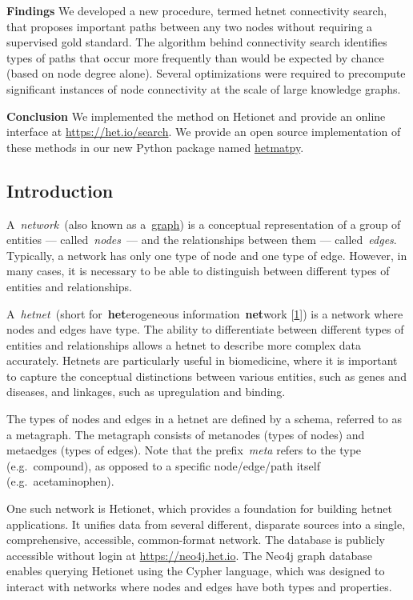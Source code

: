 \textbf{Findings}
We developed a new procedure, termed hetnet connectivity search, that proposes important paths between any two nodes without requiring a supervised gold standard.
The algorithm behind connectivity search identifies types of paths that occur more frequently than would be expected by chance (based on node degree alone).
Several optimizations were required to precompute significant instances of node connectivity at the scale of large knowledge graphs.

\textbf{Conclusion}
We implemented the method on Hetionet and provide an online interface at \url{https://het.io/search}.
We provide an open source implementation of these methods in our new Python package named \href{https://github.com/hetio/hetmatpy}{hetmatpy}.

\hypertarget{introduction}{%
\subsection{Introduction}\label{introduction}}

A~\emph{network}~(also known as a~\href{https://en.wikipedia.org/wiki/Graph_(discrete_mathematics)}{graph}) is a conceptual representation of a group of entities --- called~\emph{nodes}~--- and the relationships between them --- called~\emph{edges}.
Typically, a network has only one type of node and one type of edge.
However, in many cases, it is necessary to be able to distinguish between different types of entities and relationships.

A~\emph{hetnet}~(short for~\textbf{het}erogeneous information~\textbf{net}work {[}\protect\hyperlink{ref-QWTAHxFj}{1}{]}) is a network where nodes and edges have type.
The ability to differentiate between different types of entities and relationships allows a hetnet to describe more complex data accurately.
Hetnets are particularly useful in biomedicine,
where it is important to capture the conceptual distinctions between various entities,
such as genes and diseases, and linkages, such as upregulation and binding.

The types of nodes and edges in a hetnet are defined by a schema, referred to as a metagraph.
The metagraph consists of metanodes (types of nodes) and metaedges (types of edges).
Note that the prefix~\emph{meta} refers to the type (e.g.~compound),
as opposed to a specific node/edge/path itself (e.g.~acetaminophen).

One such network is Hetionet, which provides a foundation for building hetnet applications.
It unifies data from several different, disparate sources into a single, comprehensive, accessible, common-format network.
The database is publicly accessible without login at \url{https://neo4j.het.io}.
The Neo4j graph database enables querying Hetionet using the Cypher language,
which was designed to interact with networks where nodes and edges have both types and properties.

